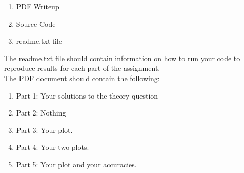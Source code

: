 \documentclass[12pt]{article}
\begin{document}
\begin{enumerate}
\item PDF Writeup
\item Source Code
\item readme.txt file
\end{enumerate}

\noindent
The readme.txt file should contain information on how to run your code to reproduce results for each part of the assignment.\\

\noindent
The PDF document should contain the following:

\begin{enumerate}
\item Part 1: Your solutions to the theory question
\item Part 2: Nothing
\item Part 3: Your plot.
\item Part 4: Your two plots.
\item Part 5: Your plot and your accuracies.
\end{enumerate}
\end{document}
